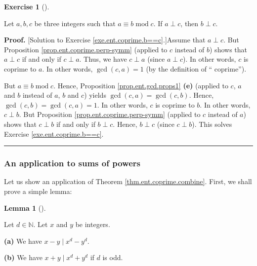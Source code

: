\documentclass[numbers=enddot,12pt,final,onecolumn,notitlepage]{scrartcl}%
\newcounter{exer}
\numberwithin{exer}{subsection}
\theoremstyle{definition}
\newtheorem{lem}[theo]{Lemma}
\newenvironment{lemma}[1][]
{\begin{lem}[#1]\begin{leftbar}}
{\end{leftbar}\end{lem}}
\newtheorem{exmp}[exer]{Exercise}
\newenvironment{exercise}[1][]
{\begin{exmp}[#1]\begin{leftbar}}
{\end{leftbar}\end{exmp}}
\newenvironment{fineprint}{\begin{small}}{\end{small}}
\newenvironment{proof}[1][Proof]{\noindent\textbf{#1.} }{\ \rule{0.5em}{0.5em}}
\begin{document}
\begin{exercise}
\label{exe.ent.coprime.b==c}Let $a,b,c$ be three integers such that $a\equiv
b\operatorname{mod}c$. If $a\perp c$, then $b\perp c$.
\end{exercise}

\begin{fineprint}
\begin{proof}
[Solution to Exercise \ref{exe.ent.coprime.b==c}.]Assume that $a\perp c$. But
Proposition \ref{prop.ent.coprime.perp-symm} (applied to $c$ instead of $b$)
shows that $a\perp c$ if and only if $c\perp a$. Thus, we have $c\perp a$
(since $a\perp c$). In other words, $c$ is coprime to $a$. In other words,
$\gcd\left(  c,a\right)  =1$ (by the definition of \textquotedblleft
coprime\textquotedblright).

But $a\equiv b\operatorname{mod}c$. Hence, Proposition
\ref{prop.ent.gcd.props1} \textbf{(e)} (applied to $c$, $a$ and $b$ instead of
$a$, $b$ and $c$) yields $\gcd\left(  c,a\right)  =\gcd\left(  c,b\right)  $.
Hence, $\gcd\left(  c,b\right)  =\gcd\left(  c,a\right)  =1$. In other words,
$c$ is coprime to $b$. In other words, $c\perp b$. But Proposition
\ref{prop.ent.coprime.perp-symm} (applied to $c$ instead of $a$) shows that
$c\perp b$ if and only if $b\perp c$. Hence, $b\perp c$ (since $c\perp b$).
This solves Exercise \ref{exe.ent.coprime.b==c}.
\end{proof}
\end{fineprint}

\subsubsection{An application to sums of powers}

Let us show an application of Theorem \ref{thm.ent.coprime.combine}. First, we
shall prove a simple lemma:

\begin{lemma}
\label{lem.ent.xd-yd}Let $d\in\mathbb{N}$. Let $x$ and $y$ be integers.

\textbf{(a)} We have $x-y\mid x^{d}-y^{d}$.

\textbf{(b)} We have $x+y\mid x^{d}+y^{d}$ if $d$ is odd.
\end{lemma}
\end{document}
